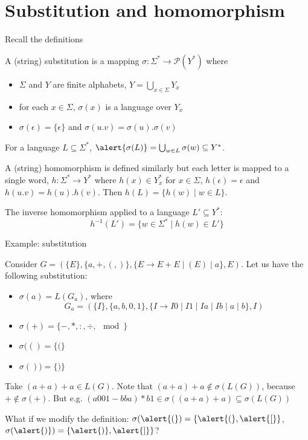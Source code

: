 \documentclass[handout]{beamer}
\begin{document}
\section*{Substitution and homomorphism}


\begin{frame}{Recall the definitions}
   
    A (string) \alert{substitution} is a mapping $\sigma\colon \Sigma^*\rightarrow \mathcal P(Y^*)$ where
    \begin{itemize}
        \item $\Sigma$ and $Y$ are finite alphabets, $Y=\bigcup_{x\in \Sigma}Y_x$
        \item for each $x\in \Sigma$, $\sigma(x)$ is a language over $Y_x$
        \item $\sigma(\epsilon)=\{\epsilon\}$ and $\sigma(u.v)=\sigma(u).\sigma(v)$
    \end{itemize}
    For a language $L\subseteq \Sigma^*$, $\alert{\sigma(L)}=\bigcup_{w\in L}\sigma(w)\subseteq Y^*$. %

    A (string) \alert{homomorphism} is defined similarly but each letter is mapped to a single word, $h\colon\Sigma^*\rightarrow Y^*$ where $h(x)\in Y_x^*$ for $x\in\Sigma$, $h(\epsilon)=\epsilon$ and $h(u.v)=h(u).h(v)$. Then \alert{$h(L)=\{h(w)\mid w\in L\}$}. %

    The \alert{inverse homomorphism} applied to a language $L'\subseteq Y^*$: 
    $$
    h^{-1}(L')=\{w\in\Sigma^*\mid h(w)\in L'\}
    $$

\end{frame}


\begin{frame}{Example: substitution}
    
    \begin{example}
    Consider $G=(\{E\},\{a,+,(,)\},\{E\rightarrow E+E\mid (E)\mid a\},E)$. Let us have the following substitution:
    \begin{itemize}
        \item $\sigma(a)=L(G_a)$, where 
        \vspace{-3pt}
        $$
        G_a=(\{I\},\{a,b,0,1\},\{I\rightarrow I0\mid I1\mid Ia\mid Ib\mid a\mid b\},I)
        $$
        \vspace{-18pt}
        \item $\sigma(+)=\{-,*,:, \div, \mod\}$
        \item $\sigma(()=\{(\}$
        \item $\sigma())=\{)\}$
    \end{itemize}
    \end{example}
    Take $(a+a)+a\in L(G)$. Note that $(a+a)+a \notin \sigma(L(G))$, because $+\notin\sigma(+)$. But e.g. $(a001-bba)*b1 \in \sigma((a+a)+a)\subseteq\sigma(L(G))$

    \smallskip

    What if we modify the definition: $\sigma(\alert{(})=\{\alert{(},\alert{[}\}$, $\sigma(\alert{)})=\{\alert{)},\alert{]}\}$?

\end{frame}
\end{document}

